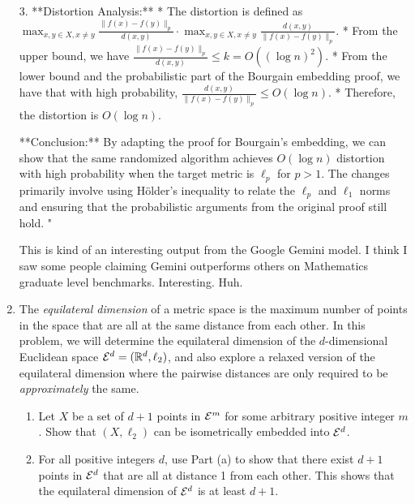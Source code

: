 \begin{enumerate}
\begin{shaded}
3.  **Distortion Analysis:**
    * The distortion is defined as $\max_{x, y \in X, x \neq y} \frac{\|f(x) - f(y)\|_p}{d(x, y)} \cdot \max_{x, y \in X, x \neq y} \frac{d(x, y)}{\|f(x) - f(y)\|_p}$.
    * From the upper bound, we have $\frac{\|f(x) - f(y)\|_p}{d(x, y)} \leq k = O((\log n)^2)$.
    * From the lower bound and the probabilistic part of the Bourgain embedding proof, we have that with high probability, $\frac{d(x,y)}{\|f(x)-f(y)\|_p} \leq O(\log n)$.
    * Therefore, the distortion is $O(\log n)$.

**Conclusion:**
By adapting the proof for Bourgain's embedding, we can show that the same randomized algorithm achieves $O(\log n)$ distortion with high probability when the target metric is $\ell_p$ for $p > 1$. The changes primarily involve using Hölder's inequality to relate the $\ell_p$ and $\ell_1$ norms and ensuring that the probabilistic arguments from the original proof still hold.
"

This is kind of an interesting output from the Google Gemini model. I think I saw some people claiming Gemini outperforms others on Mathematics graduate level benchmarks. Interesting. Huh.

\fi
\end{shaded}
\fi

\item {}
The \emph{equilateral dimension} of a metric space is the maximum number of points in the space that are all at the same distance from each other.
In this problem, we will determine the equilateral dimension of the $d$-dimensional Euclidean space $\mathcal{E}^d = (\mathbb{R}^d, \ell_2)$, and also explore a relaxed version of the equilateral dimension where the pairwise distances are only required to be 
\emph{approximately} the same.
\begin{enumerate}
\item {} Let $X$ be a set of $d+1$ points in $\mathcal{E}^m$ for some arbitrary positive integer $m$. Show that $(X, \ell_2)$ can be isometrically embedded into $\mathcal{E}^{d}$.\\
\item {} For all positive integers $d$, use Part (a) to show that there exist $d+1$ points in $\mathcal{E}^d$ that are all at distance 1 from each other. This shows that the equilateral dimension of $\mathcal{E}^d$ is at least $d+1$.


\end{enumerate}
\end{enumerate}
